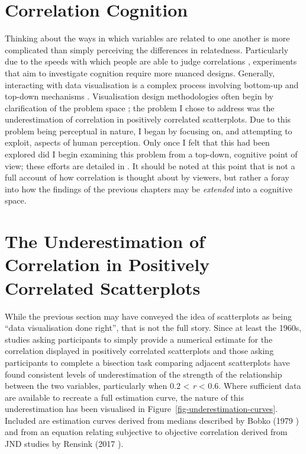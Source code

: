 \documentclass[../main.tex]{subfiles}
\begin{document}
\section{Correlation Cognition}\label{corr-cognition}

Thinking about the ways in which variables are related to one another is
more complicated than simply perceiving the differences in relatedness.
Particularly due to the speeds with which people are able to judge
correlations \cite{rensink_2014}, experiments that aim to investigate
cognition require more nuanced designs. Generally, interacting with data
visualisation is a complex process involving bottom-up and top-down
mechanisms \cite{rensink_2017, franconeri_2021,
xiong_2023}. Visualisation design methodologies often begin by
clarification of the problem space \cite{munzner_2009, mckenna_2014};
the problem I chose to address was the underestimation of correlation in
positively correlated scatterplots. Due to this problem being perceptual
in nature, I began by focusing on, and attempting to exploit, aspects of
human perception. Only once I felt that this had been explored did I
begin examining this problem from a top-down, cognitive point of view;
these efforts are detailed in . It should be
noted at this point that  is not a full account
of how correlation is thought about by viewers, but rather a foray into
how the findings of the previous chapters may be \emph{extended} into a
cognitive space.

\section{The Underestimation of Correlation in Positively Correlated
Scatterplots}\label{underestimation-related-work}

While the previous section may have conveyed the idea of scatterplots as
being ``data visualisation done right'', that is not the full story.
Since at least the 1960s, studies asking participants to simply provide
a numerical estimate for the correlation displayed in positively
correlated scatterplots
\cite{erlick_1966, strahan_1978, bobko_1979, cleveland_1982, lane_1985, lauer_1989, collyer_1990,
meyer_1992} and those asking participants to complete a bisection task
comparing adjacent scatterplots \cite{rensink_2017} have found
consistent levels of underestimation of the strength of the relationship
between the two variables, particularly when 0.2 \textless{} \emph{r}
\textless{} 0.6. Where sufficient data are available to recreate a full
estimation curve, the nature of this underestimation has been visualised
in Figure~\ref{fig-underestimation-curves}. Included are estimation
curves derived from medians described by Bobko (1979 \cite{bobko_1979})
and from an equation relating subjective to objective correlation
derived from JND studies by Rensink (2017 \cite{rensink_2017}).
\end{document}
